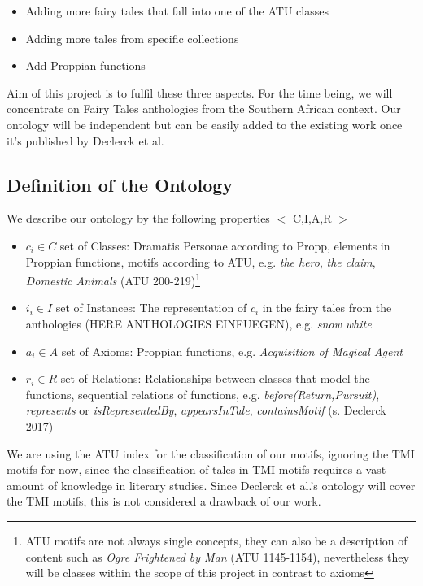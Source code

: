 \documentclass[10pt,a4paper]{article}
\begin{document}
	\begin{itemize}
		\item Adding more fairy tales that fall into one of the ATU classes
		\item Adding more tales from specific collections
		\item Add Proppian functions
		
	\end{itemize}	  
	
	Aim of this project is to fulfil these three aspects. For the time being, we will concentrate on Fairy Tales anthologies from the Southern African context. Our ontology will be independent but can be easily added to the existing work once it's published by Declerck et al. 
	\subsection{Definition of the Ontology}
	We describe our ontology by the following properties $<$ C,I,A,R $>$

\begin{itemize}
	
	\item $c_{i} \in C $ set of Classes: Dramatis Personae according to Propp, elements in Proppian functions, motifs according to ATU, e.g. \textit{the hero}, \textit{the claim},       \textit{Domestic Animals} (ATU 200-219)\footnote{ATU motifs are not always single concepts, they can also be a description of content such as \textit{Ogre Frightened by Man} (ATU 1145-1154), nevertheless they will be classes within the scope of this project in contrast to axioms}
	\item $i_{i} \in I $ set of Instances: The representation of $c_{i}$ in the fairy tales from the anthologies (HERE ANTHOLOGIES EINFUEGEN), e.g. \textit{snow white} 
	\item $a_{i} \in A$  set of Axioms: Proppian functions, e.g. \textit{Acquisition of Magical Agent} 
	\item $r_{i} \in R $ set of Relations: Relationships between classes that model the functions, sequential relations of functions, e.g. \textit{before(Return,Pursuit)}, \textit{represents} or \textit{isRepresentedBy}, \textit{appearsInTale}, \textit{containsMotif} (s. Declerck 2017)
	 
\end{itemize}

We are using the ATU index for the classification of our motifs, ignoring the TMI motifs for now, since the classification of tales in TMI motifs requires a vast amount of  knowledge in literary studies. Since Declerck et al.'s ontology will cover the TMI motifs, this is not considered a drawback of our work. 
\end{document}
